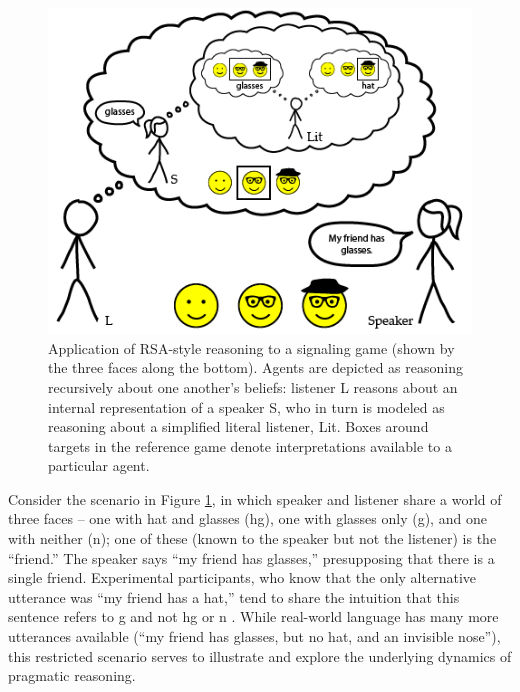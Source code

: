 \documentclass[]{elsarticle}
\begin{document}
\begin{figure}[t]
\begin{center}
\includegraphics[width=1.0\textwidth]{image02.png}
\caption{\label{fig:hg} Application of RSA-style reasoning to a signaling
game (shown by the three faces along the bottom). Agents are depicted as reasoning recursively about one another's beliefs: listener L reasons about an internal representation of a speaker S, who in turn is modeled as reasoning about a simplified literal listener, Lit. 
Boxes around targets in the reference game denote interpretations available to a particular agent.}
\end{center}
\end{figure}

Consider the scenario in Figure \ref{fig:hg}, in which speaker and listener share a
world of three faces -- one with hat and glasses ({\sc hg}), one with glasses
only ({\sc g}), and one with neither ({\sc n}); one of these (known to the speaker
but not the listener) is the ``friend.'' The speaker says ``my friend
has glasses,'' presupposing that there is a single friend. 
Experimental participants, who know that the only alternative utterance was ``my friend has a hat,'' tend to share the intuition that this sentence refers to {\sc g} and not {\sc hg} or {\sc n} \citep{stiller2011,stiller2015}. While real-world language has many more utterances available (``my friend has glasses, but no hat, and an invisible nose''), this restricted scenario serves to illustrate and explore the underlying dynamics of pragmatic reasoning.
\end{document}
